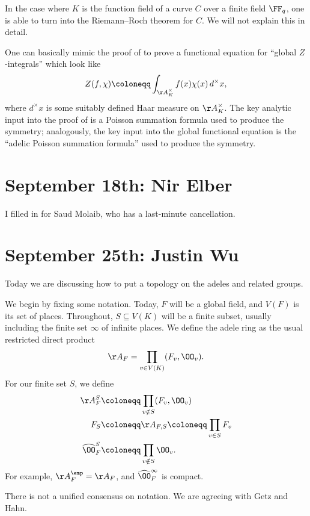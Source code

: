 \documentclass{article}
\begin{document}
\begin{remark}[Reed]
	In the case where $K$ is the function field of a curve $C$ over a finite field $\FF_q$, one is able to turn  into the Riemann--Roch theorem for $C$. We will not explain this in detail.
\end{remark}
\begin{remark}
	One can basically mimic the proof of  to prove a functional equation for ``global $Z$-integrals'' which look like
	\[Z(f,\chi)\coloneqq\int_{\AA_K^\times}f(x)\chi(x)\,d^\times x,\]
	where $d^\times x$ is some suitably defined Haar measure on $\AA_K^\times$. The key analytic input into the proof of  is a Poisson summation formula used to produce the symmetry; analogously, the key input into the global functional equation is the ``adelic Poisson summation formula''  used to produce the symmetry.
\end{remark}

\section{September 18th: Nir Elber}
I filled in for Saud Molaib, who has a last-minute cancellation.




\section{September 25th: Justin Wu}
Today we are discussing how to put a topology on the adeles and related groups.

We begin by fixing some notation. Today, $F$ will be a global field, and $V(F)$ is its set of places. Throughout, $S\subseteq V(K)$ will be a finite subset, usually including the finite set $\infty$ of infinite places. We define the adele ring as the usual restricted direct product
\[\AA_F=\prod_{v\in V(K)}(F_v,\OO_v).\]
For our finite set $S$, we define
\begin{align*}
	\AA_F^S &\coloneqq \prod_{v\notin S}(F_v,\OO_v) \\
	F_S &\coloneqq \AA_{F,S}\coloneqq\prod_{v\in S}F_v \\
	\widehat\OO_F^S &\coloneqq\prod_{v\notin S}\OO_v.
\end{align*}
For example, $\AA_F^\emp=\AA_F$, and $\widehat\OO_F^\infty$ is compact.
\begin{remark}
	There is not a unified consensus on notation. We are agreeing with Getz and Hahn.
\end{remark}
\end{document}
